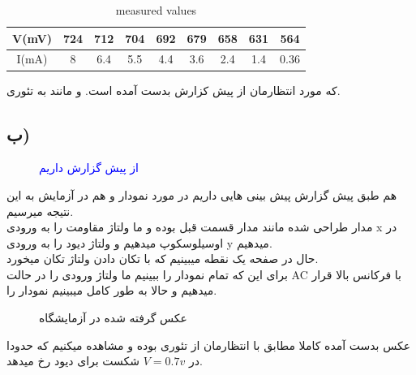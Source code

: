 \begin{latin}
    \begin{table}[h]
        \centering
        \begin{tabular}{|c|c|c|c|c|c|c|c|c|}
            \hline
            V(mV) & 724 & 712 & 704 & 692 & 679 & 658 & 631 & 564  \\
            \hline
            I(mA) & 8   & 6.4 & 5.5 & 4.4 & 3.6 & 2.4 & 1.4 & 0.36 \\
            \hline
        \end{tabular}
        \caption{measured values}
    \end{table}
\end{latin}
که مورد انتظارمان از پیش کزارش بدست آمده است. و مانند به تئوری.\\
\pagebreak
\subsection{ب)}
\begin{figure}[h]
    \centering
    \caption{\textcolor{blue}{از پیش گزارش داریم}}
\end{figure}
هم طبق پیش گزارش پیش بینی هایی داریم در مورد نمودار و هم در آزمایش به این
نتیجه میرسیم.\\
مدار طراحی شده مانند مدار قسمت قبل بوده و ما ولتاژ مقاومت را به ورودی
x در اوسیلوسکوپ میدهیم و ولتاژ دیود را به ورودی y میدهیم.\\
حال در صفحه یک نقطه میبینیم که با تکان دادن ولتاژ تکان میخورد.\\
برای این که تمام نمودار را ببینیم ما ولتاژ ورودی را در حالت AC با
فرکانس بالا قرار میدهیم و حالا به طور کامل میبینیم نمودار را.
\begin{figure}[!h]
    \centering
    \caption{عکس گرفته شده در آزمایشگاه}
\end{figure}
عکس بدست آمده کاملا مطابق با انتظارمان از تئوری بوده و مشاهده میکنیم که
حدودا در $V=0.7v$ شکست برای دیود رخ میدهد.
\pagebreak
